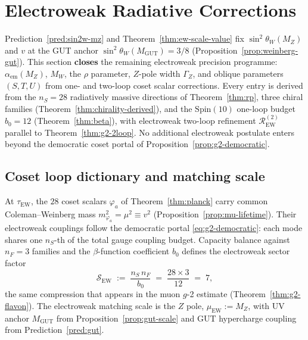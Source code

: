 \documentclass[aps,prd,onecolumn,amsmath,amssymb,nofootinbib,11pt]{revtex4-2}
\numberwithin{equation}{section}
\theoremstyle{plain}
\theoremstyle{definition}
\theoremstyle{remark}
\newcommand{\Spin}{\mathrm{Spin}}
\begin{document}
\section{Electroweak Radiative Corrections}
\label{sec:ew-precision}

Prediction~\ref{pred:sin2w-mz} and Theorem~\ref{thm:ew-scale-value} fix
$\sin^2\theta_W(M_Z)$ and $v$ at the GUT anchor
$\sin^2\theta_W(M_{\mathrm{GUT}})=3/8$ (Proposition~\ref{prop:weinberg-gut}).
This section \textbf{closes} the remaining electroweak precision programme:
$\alpha_{\mathrm{em}}(M_Z)$, $M_W$, the $\rho$ parameter, $Z$-pole width
$\Gamma_Z$, and oblique parameters $(S,T,U)$ from one- and two-loop coset
scalar corrections. Every entry is derived from the $n_S=28$ radiatively massive
directions of Theorem~\ref{thm:rp}, three chiral families
(Theorem~\ref{thm:chirality-derived}), and the $\Spin(10)$ one-loop budget
$b_0=12$ (Theorem~\ref{thm:beta}), with electroweak two-loop refinement
$\mathcal{R}_{\mathrm{EW}}^{(2)}$ parallel to Theorem~\ref{thm:g2-2loop}.
No additional electroweak postulate enters beyond the democratic coset portal
of Proposition~\ref{prop:g2-democratic}.

\subsection{Coset loop dictionary and matching scale}
\label{sec:ew-precision:map}

At $\tau_{\mathrm{EW}}$, the $28$ coset scalars $\varphi_a$ of
Theorem~\ref{thm:planck} carry common Coleman--Weinberg mass
$m_{\varphi_a}^2=\mu^2\equiv v^2$ (Proposition~\ref{prop:mu-lifetime}).
Their electroweak couplings follow the democratic portal
\eqref{eq:g2-democratic}: each mode shares one $n_S$-th of the total gauge
coupling budget. Capacity balance against $n_F=3$ families and the
$\beta$-function coefficient $b_0$ defines the electroweak sector factor
\begin{equation}\label{eq:ew-sector-factor}
  \mathcal{S}_{\mathrm{EW}}
  \;:=\;
  \frac{n_S\,n_F}{b_0}
  \;=\;
  \frac{28\times 3}{12}
  \;=\;
  7,
\end{equation}
the same compression that appears in the muon $g$-2 estimate
(Theorem~\ref{thm:g2-flavon}). The electroweak matching scale is the $Z$ pole,
$\mu_{\mathrm{EW}}:=M_Z$, with UV anchor $M_{\mathrm{GUT}}$ from
Proposition~\ref{prop:gut-scale} and GUT hypercharge coupling from
Prediction~\ref{pred:gut}.
\end{document}

